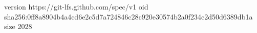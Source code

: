 version https://git-lfs.github.com/spec/v1
oid sha256:0ff8a8904b4a4cd6e2c5d7a724846c28c920e30574b2a0f234c2d50d6389db1a
size 2028
